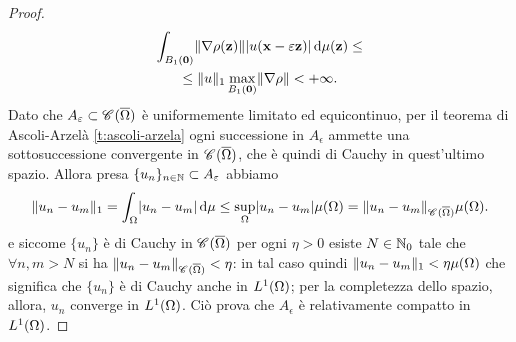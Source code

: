 \begin{proof}
\begin{multline}
        \int_{B_1(\vec 0)}\norm{\grad\rho(\vec z)}\abs{u(\vec x-\epsilon\vec z)}\,\dd\mu(\vec z)\le\\ \le
        \norm{u}_1\max_{B_1(\vec 0)}\norm{\grad\rho}<
        +\infty.
    \end{multline}
    Dato che $A_\epsilon\subset\cont{\clos{\Omega}}$ è uniformemente limitato ed equicontinuo, per il teorema di Ascoli-Arzelà \ref{t:ascoli-arzela} ogni successione in $A_\epsilon$ ammette una sottosuccessione convergente in $\cont{\clos{\Omega}}$, che è quindi di Cauchy in quest'ultimo spazio.
    Allora presa $\{u_n\}_{n\in\N}\subset A_\epsilon$ abbiamo
    \begin{equation}
        \norm{u_n-u_m}_1=
        \int_\Omega\abs{u_n-u_m}\,\dd\mu\le
        \sup_\Omega\abs{u_n-u_m}\mu(\Omega)=
        \norm{u_n-u_m}_{\cont{\clos{\Omega}}}\mu(\Omega).
    \end{equation}
    e siccome $\{u_n\}$ è di Cauchy in $\cont{\clos{\Omega}}$ per ogni $\eta>0$ esiste $N\in\N_0$ tale che $\forall n,m>N$ si ha $\norm{u_n-u_m}_{\cont{\clos{\Omega}}}<\eta$: in tal caso quindi $\norm{u_n-u_m}_1<\eta\mu(\Omega)$ che significa che $\{u_n\}$ è di Cauchy anche in $\leb[1]{\Omega}$; per la completezza dello spazio, allora, $u_n$ converge in $\leb[1]{\Omega}$.
    Ciò prova che $A_\epsilon$ è relativamente compatto in $\leb[1]{\Omega}$.


\end{proof}
